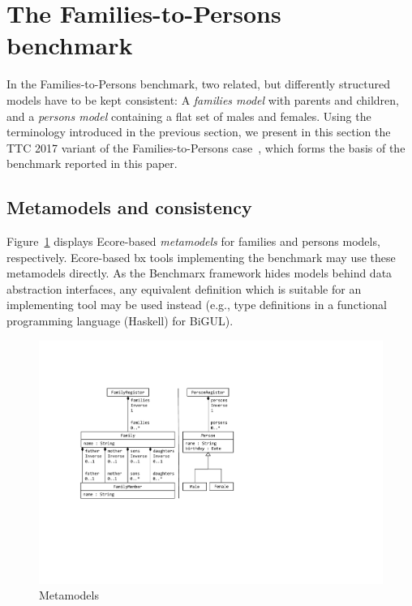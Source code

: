 

\section{The Families-to-Persons benchmark}
\label{sec:FamiliesToPersons}



In the Families-to-Persons benchmark, two related, but differently structured models have to be kept consistent: A \emph{families model} with parents and children, and a \emph{persons model} containing a flat set of males and females. 
Using the terminology introduced in the previous section, we present in this section the TTC 2017 variant of the Families-to-Persons case~\cite{Anjorin2017a,ENASE2018-Westfechtel}, which forms the basis of the benchmark reported in this paper. 

\subsection{Metamodels and consistency}
\label{sec:MetamodelsAndConsistency}

Figure~\ref{fig:metamodels} displays Ecore-based \emph{metamodels} for families and persons models, respectively.
Ecore-based bx tools implementing the benchmark may use these metamodels directly.
As the Benchmarx framework hides models behind data abstraction interfaces, any equivalent definition which is suitable for an implementing tool may be used instead (e.g., type definitions in a functional programming language (Haskell) for BiGUL).

\begin{figure}[tb!]
	\centering
	\includegraphics[width=\columnwidth]{diagrams/f2p-case/Metamodels}
	\caption{Metamodels}
	\label{fig:metamodels}
\end{figure}

